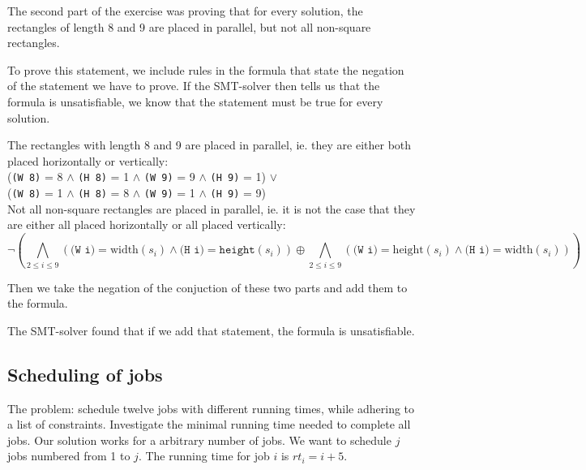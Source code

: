 \documentclass[12pt]{article}
\begin{document}
The second part of the exercise was proving that for every solution, 
the rectangles of length 8 and 9 are placed in parallel, 
but not all non-square rectangles. 

To prove this statement, we include rules in the formula 
that state the negation of the statement we have to prove.
If the SMT-solver then tells us that the formula is unsatisfiable, we know that the statement must be true for every solution. 


The rectangles with length 8 and 9 are placed in parallel, 
ie. they are either both placed horizontally or vertically:\\
(\texttt{(W 8)} = 8 $\wedge$ \texttt{(H 8)} = 1 $\wedge$
\texttt{(W 9)} = 9 $\wedge$ \texttt{(H 9)} = 1)
$\vee$\\
(\texttt{(W 8)} = 1 $\wedge$ \texttt{(H 8)} = 8 $\wedge$
\texttt{(W 9)} = 1 $\wedge$ \texttt{(H 9)} = 9)\\

Not all non-square rectangles are placed in parallel, ie. it is not the case that they are either all placed horizontally or all placed vertically:
\[
\neg
\left(
\bigwedge_{2 \le i \le 9}
\left( 
\texttt{(W i)} = \text{width}(s_i) \wedge \texttt{(H i)} = \texttt{height}(s_i)
\right)
\oplus
\bigwedge_{2 \le i \le 9}
\left(
\texttt{(W i)} = \text{height}(s_i) \wedge \texttt{(H i)} = \text{width}(s_i)
\right)
\right)
\]

Then we take the negation of the conjuction of these two parts and add them to the formula.

The SMT-solver found that if we add that statement, the formula is unsatisfiable. 


\subsection*{Scheduling of jobs}
The problem: schedule twelve jobs with different running times, while adhering to a list of constraints.
Investigate the minimal running time needed to complete all jobs.
Our solution works for a arbitrary number of jobs.
We want to schedule $j$ jobs numbered from 1 to $j$.
The running time for job $i$ is $rt_i = i+5$.
\end{document}
